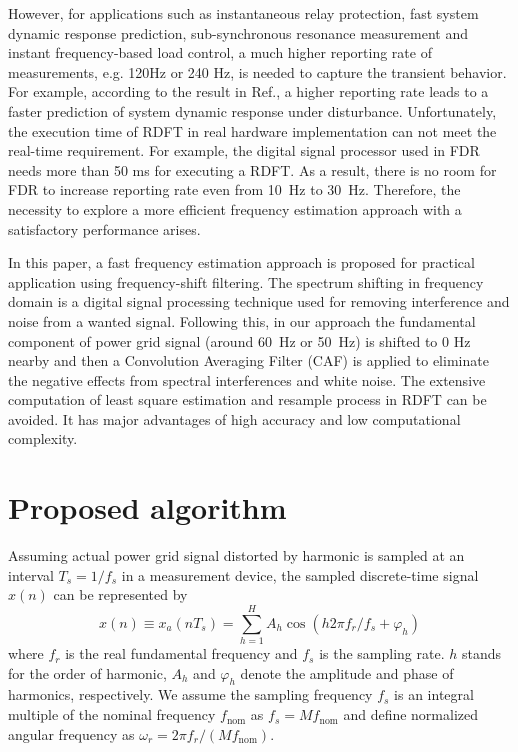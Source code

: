\documentclass[journal,twoside]{IEEEtran}
\begin{document}
 However, for  applications such as instantaneous relay protection\cite{PRC-024-1}, fast system dynamic response prediction\cite{6863288,68632881}, sub-synchronous resonance measurement \cite{7098450} and instant frequency-based load control\cite{7976165}, a much higher reporting rate of  measurements, e.g. 120Hz or 240 Hz, is needed to capture the transient behavior. For example, according to the result in Ref.\cite{68632881}, a higher reporting rate leads to a faster prediction of system dynamic response under disturbance.  Unfortunately, the execution time of RDFT in real hardware implementation can not meet the real-time requirement.
 For example, the digital signal processor used in FDR needs more than 50 ms for executing a RDFT. As a result, there is no room for FDR to increase reporting rate even from 10~Hz to 30~Hz. Therefore,  the necessity to explore a more efficient frequency estimation approach with  a satisfactory performance arises.

 In this paper, a fast frequency estimation approach is proposed for practical application using frequency-shift filtering. The spectrum shifting in frequency domain  is a  digital signal processing technique used for removing interference and noise from a wanted signal\cite{fresh}. Following this, in our approach the  fundamental component of power grid signal (around 60~Hz or 50~Hz) is shifted to 0 Hz nearby and then a Convolution Averaging Filter (CAF) is applied to eliminate the negative effects from spectral interferences and white noise. The extensive computation of least square estimation and resample process in RDFT can be avoided. It has major advantages of high accuracy and low computational complexity.
\section{Proposed  algorithm}
Assuming  actual power grid signal distorted by harmonic is sampled at  an interval $T_s=1/f_s$ in a measurement device,  the sampled discrete-time signal $x(n)$ can be represented by
\begin{equation}
x(n)\equiv x_a(nT_s)=\sum_{h=1}^{H}A_h\cos (h2\pi f_r/f_s+\varphi_h)\label{eqn_3}
\end{equation}
where $f_r$ is the real fundamental frequency and $f_s$ is the sampling rate. $h$ stands for the order of harmonic, $A_h$ and $\varphi_h$ denote the amplitude and phase of  harmonics, respectively.
We assume the sampling frequency $f_s$ is an integral multiple of the nominal frequency $f_\mathrm{nom}$ as $f_s=Mf_\mathrm{nom}$ and define normalized angular frequency as  $\omega_r=2\pi f_r/(Mf_\mathrm{nom})$. 
\end{document}
